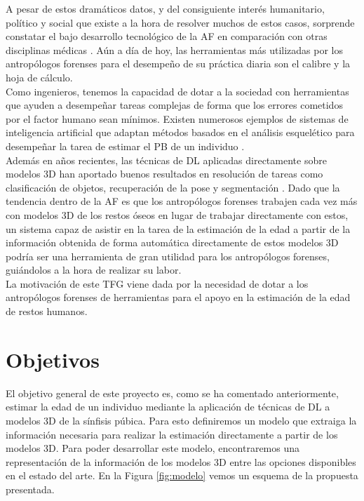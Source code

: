 A pesar de estos dramáticos datos, y del consiguiente interés humanitario, político y social que existe a la hora de resolver muchos de estos casos, sorprende constatar el bajo desarrollo tecnológico de la AF en comparación con otras disciplinas médicas \cite{mesejo2020survey}. Aún a día de hoy, las herramientas más utilizadas por los antropólogos forenses para el desempeño de su práctica diaria son el calibre y la hoja de cálculo.\\

Como ingenieros, tenemos la capacidad de dotar a la sociedad con herramientas que ayuden a desempeñar tareas complejas de forma que los errores cometidos por el factor humano sean mínimos. Existen numerosos ejemplos de sistemas de inteligencia artificial que adaptan métodos basados en el análisis esquelético para desempeñar la tarea de estimar el PB de un individuo \cite{mesejo2020survey}.\\

Además en años recientes, las técnicas de DL aplicadas directamente sobre modelos 3D han aportado buenos resultados en resolución de tareas como clasificación de objetos, recuperación de la pose y segmentación \cite{ahmed2018survey,gezawa2020review}. Dado que la tendencia dentro de la AF es que los antropólogos forenses trabajen cada vez más con modelos 3D de los restos óseos en lugar de trabajar directamente con estos, un sistema capaz de asistir en la tarea de la estimación de la edad a partir de la información obtenida de forma automática directamente de estos modelos 3D podría ser una herramienta de gran utilidad para los antropólogos forenses, guiándolos a la hora de realizar su labor.\\

La motivación de este TFG viene dada por la necesidad de dotar a los antropólogos forenses de herramientas para el apoyo en la estimación de la edad de restos humanos.\\

\section{Objetivos}

El objetivo general de este proyecto es, como se ha comentado anteriormente, estimar la edad de un individuo mediante la aplicación de técnicas de DL a modelos 3D de la sínfisis púbica. Para esto definiremos un modelo que extraiga la información necesaria para realizar la estimación directamente a partir de los modelos 3D. Para poder desarrollar este modelo, encontraremos una representación de la información de los modelos 3D entre las opciones disponibles en el estado del arte. En la Figura \ref{fig:modelo} vemos un esquema de la propuesta presentada.\\


